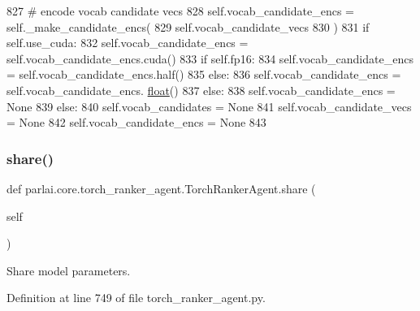 \begin{DoxyCode}
827                     \textcolor{comment}{# encode vocab candidate vecs}
828                     self.vocab\_candidate\_encs = self.\_make\_candidate\_encs(
829                         self.vocab\_candidate\_vecs
830                     )
831                     \textcolor{keywordflow}{if} self.use\_cuda:
832                         self.vocab\_candidate\_encs = self.vocab\_candidate\_encs.cuda()
833                     \textcolor{keywordflow}{if} self.fp16:
834                         self.vocab\_candidate\_encs = self.vocab\_candidate\_encs.half()
835                     \textcolor{keywordflow}{else}:
836                         self.vocab\_candidate\_encs = self.vocab\_candidate\_encs.
      \hyperlink{namespaceprojects_1_1controllable__dialogue_1_1make__control__dataset_aa2b7207688c641dbc094ab44eca27113}{float}()
837                 \textcolor{keywordflow}{else}:
838                     self.vocab\_candidate\_encs = \textcolor{keywordtype}{None}
839             \textcolor{keywordflow}{else}:
840                 self.vocab\_candidates = \textcolor{keywordtype}{None}
841                 self.vocab\_candidate\_vecs = \textcolor{keywordtype}{None}
842                 self.vocab\_candidate\_encs = \textcolor{keywordtype}{None}
843 
\end{DoxyCode}
\mbox{\label{classparlai_1_1core_1_1torch__ranker__agent_1_1TorchRankerAgent_a9ba5899b6497645bb6d406ecc2441da7}} 
\subsubsection{\texorpdfstring{share()}{share()}}
{\footnotesize\ttfamily def parlai.\+core.\+torch\+\_\+ranker\+\_\+agent.\+Torch\+Ranker\+Agent.\+share (\begin{DoxyParamCaption}\item[{}]{self }\end{DoxyParamCaption})}

\begin{DoxyVerb}Share model parameters.
\end{DoxyVerb}
 

Definition at line 749 of file torch\+\_\+ranker\+\_\+agent.\+py.


